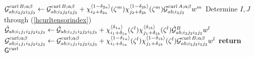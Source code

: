 \begin{algorithm}[ht!]
\begin{algorithmic}
                                    \State$\mathcal{G}_{ab;i_2j_2i_3j_3}^{\operatorname{curl} B;\alpha \beta}\gets \mathcal{G}_{ab;i_2j_2i_3j_3}^{\operatorname{curl} B;\alpha \beta} + \chi_{i_2+\delta_{2a}}^{\langle1-\delta_{2a}\rangle}(\zeta^m) \chi_{j_2+\delta_{2b}}^{\langle1-\delta_{2b}\rangle}(\zeta^m) \mathcal{G}_{ab;i_3j_3}^{\operatorname{curl} A;\alpha \beta} w^m$ \Comment{(\ref{GB_hcurl1})}
                                    \EndFor
                                \EndIf
                        \EndFor       
                \EndFor
            \EndFor            
                            \State Determine $I,J$ through (\ref{hcurltensorindex})
                                            \State$\check{\mathcal{G}}_{ab;i_1j_1i_2j_2i_3j_3}\gets \check{\mathcal{G}}_{ab;i_1j_1i_2j_2i_3j_3} + \chi_{i_1+\delta_{1a}}^{\langle\delta_{1a}\rangle}(\zeta^l) \chi_{j_1+\delta_{1b}}^{\langle\delta_{1b}\rangle}(\zeta^l) \check{\mathcal{G}}_{ab;i_2j_2i_3j_3}^{B} w^l$
                                            \State$\mathcal{G}_{ab;i_1j_1i_2j_2i_3j_3}^{\operatorname{curl};\alpha \beta}\gets \mathcal{G}_{ab;i_1j_1i_2j_2i_3j_3}^{\operatorname{curl};\alpha \beta} + \chi_{i_1+\delta_{1a}}^{\langle1-\delta_{1a}\rangle}(\zeta^l) \chi_{j_1+\delta_{1b}}^{\langle1-\delta_{1b}\rangle}(\zeta^l) \mathcal{G}_{ab;i_2j_2i_3j_3}^{\operatorname{curl} B;\alpha \beta} w^l$                                             
                                            \EndFor
                                        \EndIf
                                \EndFor
                            \EndIf
                    \EndFor
            \EndFor
    \EndFor
\EndFor
\State \textbf{return} $\mathsf{G}^{\operatorname{curl}}$
\EndProcedure
\end{algorithmic}
\end{algorithm}

